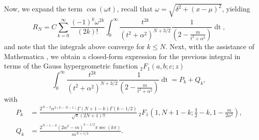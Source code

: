 \documentclass[10pt,a4paper,oneside]{article}
\numberwithin{equation}{section}
\begin{document}
Now, we expand the term $\cos(\omega t)$, recall that $\omega = \sqrt{\delta^2 + (x-\mu)^2}$, yielding
\begin{equation}\label{convergent_remainder_series_integral}
R_N = C \sum_{k=0}^{\infty} \frac{(-1)^k \omega^{2k}}{(2k)!} \int_0^{\infty} \frac{t^{2k}}{(t^2 + \alpha^2)^{N + 3/2}} \frac{1}{\left(2 - \frac{m}{t^2+ \alpha^2}\right)} \mathop{dt},
\end{equation}
and note that the integrals above converge for $k \le N$. Next, with the assistance of Mathematica \cite{Mathematica}, we obtain a closed-form expression for the previous integral in terms of the Gauss hypergeometric function $_2F_1(a, b; c; z)$
\begin{equation}\label{convergent_remainder_inner_integral}
\int_0^{\infty} \frac{t^{2k}}{(t^2 + \alpha^2)^{N + 3/2}} \frac{1}{\left(2 - \frac{m}{t^2+ \alpha^2}\right)} \mathop{dt} = P_k + Q_k,
\end{equation}
with
\begin{align}
P_k &= \frac{2^{N-2}\alpha^{2(k - N - 1)} \Gamma(N + 1 - k) \Gamma(k - 1/2)}{\sqrt{\pi} (2N + 1)!!} \, _2F_1\left(1, N + 1 - k; \frac{3}{2} -k, 1 - \frac{m}{2\alpha^2}\right),\\
Q_k &= \frac{2^{N-1-k}(2\alpha^2 - m)^{k - 1/2} \pi \sec(k\pi)}{m^{N + 1/2}}.
\end{align}
\end{document}
